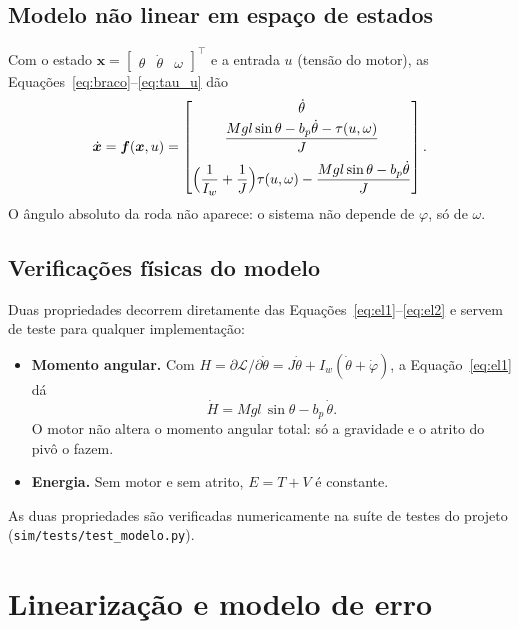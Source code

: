 \documentclass[11pt,a4paper]{article}
\newcommand{\vt}[1]{\bm{#1}}
\begin{document}
\subsection{Modelo não linear em espaço de estados}

Com o estado $\vt{x} = \begin{bmatrix}\theta & \dot\theta & \omega\end{bmatrix}^{\!\top}$ e a
entrada $u$ (tensão do motor), as Equações~\eqref{eq:braco}--\eqref{eq:tau_u} dão
\begin{equation}
  \dot{\vt{x}} = \vt{f}(\vt{x}, u) =
  \begin{bmatrix}
    \dot\theta \\[2pt]
    \dfrac{Mgl\sin\theta - b_p\dot\theta - \tau(u,\omega)}{J} \\[10pt]
    \Bigl(\dfrac{1}{I_w} + \dfrac{1}{J}\Bigr)\tau(u,\omega) - \dfrac{Mgl\sin\theta - b_p\dot\theta}{J}
  \end{bmatrix} .
  \label{eq:naolinear}
\end{equation}
O ângulo absoluto da roda não aparece: o sistema não depende de $\varphi$, só de $\omega$.

\subsection{Verificações físicas do modelo}

Duas propriedades decorrem diretamente das Equações~\eqref{eq:el1}--\eqref{eq:el2} e servem
de teste para qualquer implementação:
\begin{itemize}
  \item \textbf{Momento angular.} Com $H = \partial\mathcal{L}/\partial\dot\theta
    = J\dot\theta + I_w(\dot\theta + \dot\varphi)$, a Equação~\eqref{eq:el1} dá
    \begin{equation}
      \dot H = Mgl\,\sin\theta - b_p\,\dot\theta .
      \label{eq:momento}
    \end{equation}
    O motor não altera o momento angular total: só a gravidade e o atrito do pivô o fazem.
  \item \textbf{Energia.} Sem motor e sem atrito, $E = T + V$ é constante.
\end{itemize}
As duas propriedades são verificadas numericamente na suíte de testes do projeto
(\texttt{sim/tests/test\_modelo.py}).

\section{Linearização e modelo de erro}
\label{sec:erro}
\end{document}
